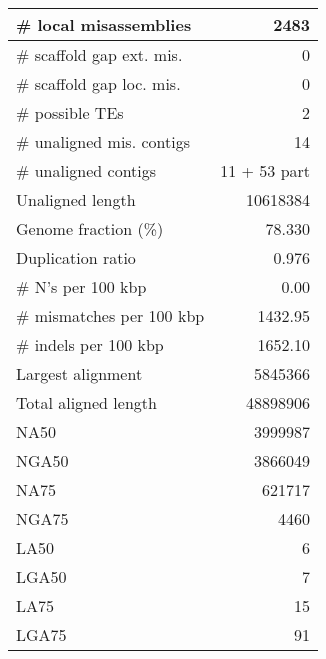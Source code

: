 \documentclass[12pt,a4paper]{article}
\begin{document}
\begin{table}[ht]
\begin{center}
\begin{tabular}{|l*{1}{|r}|}
\# local misassemblies & 2483 \\ \hline
\# scaffold gap ext. mis. & 0 \\ \hline
\# scaffold gap loc. mis. & 0 \\ \hline
\# possible TEs & 2 \\ \hline
\# unaligned mis. contigs & 14 \\ \hline
\# unaligned contigs & 11 + 53 part \\ \hline
Unaligned length & 10618384 \\ \hline
Genome fraction (\%) & 78.330 \\ \hline
Duplication ratio & 0.976 \\ \hline
\# N's per 100 kbp & 0.00 \\ \hline
\# mismatches per 100 kbp & 1432.95 \\ \hline
\# indels per 100 kbp & 1652.10 \\ \hline
Largest alignment & 5845366 \\ \hline
Total aligned length & 48898906 \\ \hline
NA50 & 3999987 \\ \hline
NGA50 & 3866049 \\ \hline
NA75 & 621717 \\ \hline
NGA75 & 4460 \\ \hline
LA50 & 6 \\ \hline
LGA50 & 7 \\ \hline
LA75 & 15 \\ \hline
LGA75 & 91 \\ \hline
\end{tabular}
\end{center}
\end{table}
\end{document}
